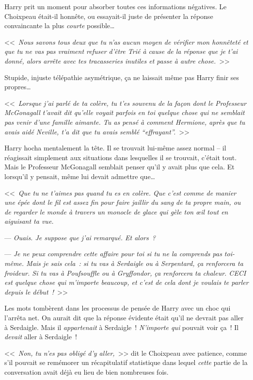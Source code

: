 Harry prit un moment pour absorber toutes ces informations négatives. Le Choixpeau était-il honnête, ou essayait-il juste de présenter la réponse convaincante la plus \emph{courte} possible…

<<~\emph{Nous savons tous deux que tu n'as aucun moyen de vérifier mon honnêteté et que tu ne vas pas vraiment refuser d'être Trié à cause de la réponse que je t'ai donné, alors arrête avec tes tracasseries inutiles et passe à autre chose.}~>>

Stupide, injuste télépathie asymétrique, ça ne laissait même pas Harry finir ses propres…

<<~\emph{Lorsque j'ai parlé de ta colère, tu t'es souvenu de la façon dont le Professeur McGonagall t'avait dit qu'elle voyait parfois en toi quelque chose qui ne semblait pas venir d'une famille aimante. Tu as pensé à comment Hermione, après que tu avais aidé Neville, t'a dit que tu avais semblé “effrayant”.}~>>

Harry hocha mentalement la tête. Il se trouvait lui-même assez normal -- il réagissait simplement aux situations dans lesquelles il se trouvait, c'était tout. Mais le Professeur McGonagall semblait penser qu'il y avait plus que cela. Et lorsqu'il y pensait, même lui devait admettre que…

<<~\emph{Que tu ne t'aimes pas quand tu es en colère. Que c'est comme de manier une épée dont le fil est assez fin pour faire jaillir du sang de ta propre main, ou de regarder le monde à travers un monocle de glace qui gèle ton œil tout en aiguisant ta vue.}

--- \emph{Ouais. Je suppose que j'ai remarqué. Et alors~?}

--- \emph{Je ne peux comprendre cette affaire pour toi si tu ne la comprends pas toi-même. Mais je sais cela~: si tu vas à Serdaigle ou à Serpentard, ça renforcera ta froideur. Si tu vas à Poufsouffle ou à Gryffondor, ça renforcera ta chaleur. CECI est quelque chose qui m'importe beaucoup, et c'est de cela dont je voulais te parler depuis le début~!}~>>

Les mots tombèrent dans les processus de pensée de Harry avec un choc qui l'arrêta net. On aurait dit que la réponse évidente était qu'il ne devrait pas aller à Serdaigle. Mais il \emph{appartenait} à Serdaigle~! \emph{N'importe qui} pouvait voir ça~! Il \emph{devait} aller à Serdaigle~!

<<~\emph{Non, tu n'es pas obligé d'y aller,}~>> dit le Choixpeau avec patience, comme s'il pouvait se remémorer un récapitulatif statistique dans lequel \emph{cette} partie de la conversation avait déjà eu lieu de bien nombreuses fois.


